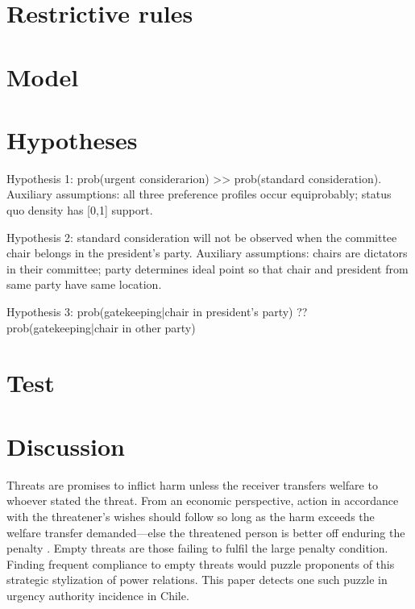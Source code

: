 \documentclass[letter,12pt]{article}
\begin{document}
\section{Restrictive rules}

\citep{dion.huber.1996,doring.restrictiveRules.2003,huber.1996a,krehbielRestrictiveRules1997}

\section{Model}

\section{Hypotheses}

Hypothesis 1: prob(urgent considerarion) >>  prob(standard consideration). Auxiliary assumptions: all three preference profiles occur equiprobably; status quo density has [0,1] support.

Hypothesis 2: standard consideration will not be observed when the committee chair belongs in the president's party. Auxiliary assumptions: chairs are dictators in their committee; party determines ideal point so that chair and president from same party have same location. 

Hypothesis 3: prob(gatekeeping|chair in president's party) ?? prob(gatekeeping|chair in other party) 

\section{Test}

\section{Discussion}


\noindent Threats are promises to inflict harm unless the receiver transfers welfare to whoever stated the threat. From an economic perspective, action in accordance with the threatener's wishes should follow so long as the harm exceeds the welfare transfer demanded---else the threatened person is better off enduring the penalty \citep{dahl.ConceptPower1957,friedrich.1941,schelling.1960}. Empty threats are those failing to fulfil the large penalty condition. Finding frequent compliance to empty threats would puzzle proponents of this strategic stylization of power relations. This paper detects one such puzzle in urgency authority incidence in Chile. 
\end{document}

